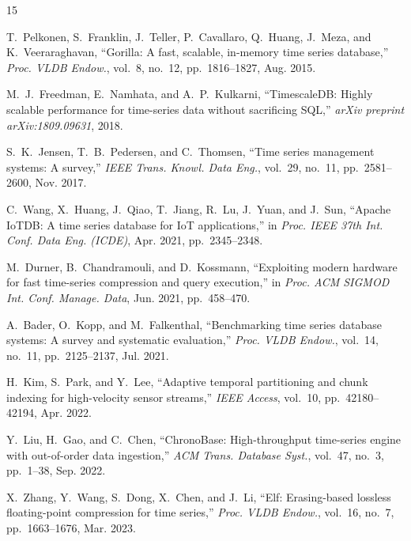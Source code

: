 \documentclass[conference,a4paper]{IEEEtran}
\begin{document}
\balance
\begin{thebibliography}{15}

T.~Pelkonen, S.~Franklin, J.~Teller, P.~Cavallaro, Q.~Huang, J.~Meza, and K.~Veeraraghavan, ``Gorilla: A fast, scalable, in-memory time series database,'' \emph{Proc. VLDB Endow.}, vol.~8, no.~12, pp.~1816--1827, Aug. 2015.

M.~J.~Freedman, E.~Namhata, and A.~P.~Kulkarni, ``TimescaleDB: Highly scalable performance for time-series data without sacrificing SQL,'' \emph{arXiv preprint arXiv:1809.09631}, 2018.

S.~K.~Jensen, T.~B.~Pedersen, and C.~Thomsen, ``Time series management systems: A survey,'' \emph{IEEE Trans. Knowl. Data Eng.}, vol.~29, no.~11, pp.~2581--2600, Nov. 2017.

C.~Wang, X.~Huang, J.~Qiao, T.~Jiang, R.~Lu, J.~Yuan, and J.~Sun, ``Apache IoTDB: A time series database for IoT applications,'' in \emph{Proc. IEEE 37th Int. Conf. Data Eng. (ICDE)}, Apr. 2021, pp.~2345--2348.

M.~Durner, B.~Chandramouli, and D.~Kossmann, ``Exploiting modern hardware for fast time-series compression and query execution,'' in \emph{Proc. ACM SIGMOD Int. Conf. Manage. Data}, Jun. 2021, pp.~458--470.

A.~Bader, O.~Kopp, and M.~Falkenthal, ``Benchmarking time series database systems: A survey and systematic evaluation,'' \emph{Proc. VLDB Endow.}, vol.~14, no.~11, pp.~2125--2137, Jul. 2021.

H.~Kim, S.~Park, and Y.~Lee, ``Adaptive temporal partitioning and chunk indexing for high-velocity sensor streams,'' \emph{IEEE Access}, vol.~10, pp.~42180--42194, Apr. 2022.

Y.~Liu, H.~Gao, and C.~Chen, ``ChronoBase: High-throughput time-series engine with out-of-order data ingestion,'' \emph{ACM Trans. Database Syst.}, vol.~47, no.~3, pp.~1--38, Sep. 2022.

X.~Zhang, Y.~Wang, S.~Dong, X.~Chen, and J.~Li, ``Elf: Erasing-based lossless floating-point compression for time series,'' \emph{Proc. VLDB Endow.}, vol.~16, no.~7, pp.~1663--1676, Mar. 2023.


\end{thebibliography}
\end{document}
